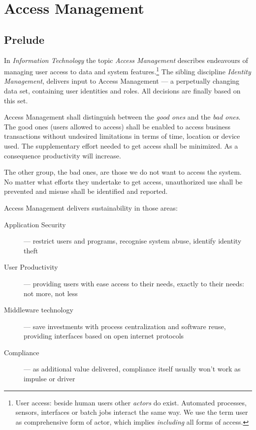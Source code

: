 

\chapter{Access Management}

\section{Prelude}

In \emph{Information Technology} the topic \emph{Access Management}
describes endeavours of managing user access to data and system
features.\footnote{User access:  beside human users other \emph{actors}
do exist.  Automated processes, sensors, interfaces or batch jobs
interact the same way.  We use the term user as comprehensive form of
actor, which implies \emph{including} all forms of access.} The sibling
discipline \emph{Identity Management}, delivers input to Access
Management --- a perpetually changing data set, containing user
identities and roles. All decisions are finally based on this set.

Access Management shall distinguish between the \emph{good ones} and the
\emph{bad ones}.  The good ones (users allowed to access) shall be
enabled to access business transactions without undesired limitations in
terms of time, location or device used. The supplementary effort needed
to get access shall be minimized.  As a consequence productivity will
increase.

The other group, the bad ones, are those we do not want to access the
system. No matter what efforts they undertake to get access,
unauthorized use shall be prevented and misuse shall be identified and
reported.

Access Management delivers sustainability in those areas:

\begin{description}
    \item[Application Security] --- restrict users and programs, recognise
        system abuse, identify identity theft
    \item[User Productivity] --- providing users with ease access to their
        needs, exactly to their needs: not more, not less
    \item[Middleware technology] --- save investments with process
        centralization and software reuse, providing interfaces based
        on open internet protocols
    \item[Compliance] --- as additional value delivered, compliance itself
        usually won't work as impulse or driver
\end{description}




